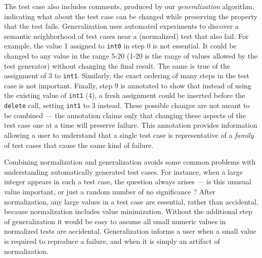 The test case also includes comments, produced by our
\emph{generalization} \cite{SmartCheck} algorithm, indicating what
about the test case can be changed while preserving the property that
the test fails.  Generalization uses automated experiments to discover
a semantic neighborhood of test cases near a (normalized) test that
also fail.  For example, the value 1 assigned to {\tt int0} in step 0
is not essential.  It could be changed to any value in the range 5-20
(1-20 is the range of values allowed by the test generator) without
changing the final result.  The same is true of the assignment of 3 to
{\tt int1}.  Similarly, the exact ordering of many steps in the test
case is not important.  Finally, step 9 is annotated to show that
instead of using the existing value of {\tt int1} (4), a fresh
assignment could be inserted before the {\tt delete} call, setting
{\tt int1} to 3 instead.  These possible changes are not meant to be
combined --- the annotation claims only that changing these aspects of
the test case one at a time will preserve failure.  This annotation
provides information allowing a user to understand that a single test
case is representative of a \emph{family} of test cases that cause the
same kind of failure.

Combining normalization and generalization avoids some common problems
with understanding automatically generated test cases.  For instance,
when a large integer appears in such a test case, the question always
arises --- is this unusual value important, or just a random number of
no significance \cite{MakeMost}?  After normalization, any large
values in a test case are essential, rather than
accidental, because normalization includes value minimization.
Without the additional step of generalization it would be
easy to assume all small numeric values in normalized
tests are accidental.  Generalization informs a user when a small
value is required to reproduce a failure, and when it is simply an
artifact of normalization.

